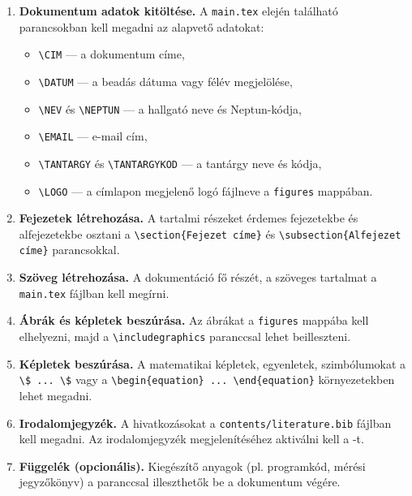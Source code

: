 \documentclass[fleqn,12pt]{article}
\makeatletter
\newcommand\LOGO{bme-logo.jpg} %
\newcommand\CIM{\LaTeX{} dokumentáció tutorial}
\newcommand\DATUM{2025/26/1}
\newcommand\NEV{Agócs Norbert}
\newcommand\NEPTUN{PhD hallgató}
\newcommand\EMAIL{nagocs@mm.bme.hu}
\newcommand\TANTARGY{Tantárgy}
\newcommand\TANTARGYKOD{BMEGE\dots}
\makeatother
\begin{document}
        \begin{enumerate}
            \item \textbf{Dokumentum adatok kitöltése.}  A \texttt{main.tex} elején található parancsokban kell megadni az alapvető adatokat:
            \begin{itemize}
                \item \verb|\CIM| — a dokumentum címe,
                \item \verb|\DATUM| — a beadás dátuma vagy félév megjelölése,
                \item \verb|\NEV| és \verb|\NEPTUN| — a hallgató neve és Neptun-kódja,
                \item \verb|\EMAIL| — e-mail cím,
                \item \verb|\TANTARGY| és \verb|\TANTARGYKOD| — a tantárgy neve és kódja,
                \item \verb|\LOGO| — a címlapon megjelenő logó fájlneve a \texttt{figures} mappában.
            \end{itemize}

            \item \textbf{Fejezetek létrehozása.}  A tartalmi részeket érdemes fejezetekbe és alfejezetekbe osztani a \verb|\section{Fejezet címe}| és \verb|\subsection{Alfejezet címe}| parancsokkal.

            \item \textbf{Szöveg létrehozása.} A dokumentáció fő részét, a szöveges tartalmat a \texttt{main.tex} fájlban kell megírni. 
 
            \item \textbf{Ábrák és képletek beszúrása.}  Az ábrákat a \texttt{figures} mappába kell elhelyezni, majd a \verb|\includegraphics| paranccsal lehet beilleszteni.

            \item \textbf{Képletek beszúrása.}  A matematikai képletek, egyenletek, szimbólumokat a \verb|\$ ... \$| vagy a \verb|\begin{equation} ... \end{equation}| környezetekben lehet megadni.

            \item \textbf{Irodalomjegyzék.}  A hivatkozásokat a \texttt{contents/literature.bib} fájlban kell megadni. Az irodalomjegyzék megjelenítéséhez aktiválni kell a 
            \verb||-t.

            \item \textbf{Függelék (opcionális).}  Kiegészítő anyagok (pl. programkód, mérési jegyzőkönyv) a \verb|| paranccsal illeszthetők be a dokumentum végére.
        \end{enumerate}
\end{document}
